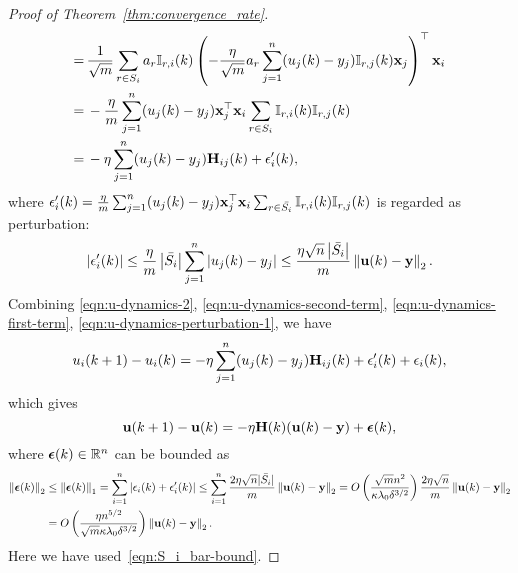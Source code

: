 \begin{proof}[Proof of Theorem~\ref{thm:convergence_rate}]
\begin{equation}
\begin{aligned}
	=\,& \frac{1}{\sqrt m} \sum_{r\in S_i} a_r \mathbb{I}_{r, i}(k) \left( - \frac{\eta}{\sqrt m} a_r \sum_{j=1}^n (u_j(k) - y_j) \mathbb{I}_{r, j}(k) \mathbf{x}_j  \right)^\top \mathbf{x}_i   \\
	=\,& -\frac{\eta}{m} \sum_{j=1}^n (u_j(k) - y_j) \mathbf{x}_j^\top\mathbf{x}_i \sum_{r\in S_i}  \mathbb{I}_{r, i}(k) \mathbb{I}_{r, j}(k) \\
	=\,& -\eta  \sum_{j=1}^n (u_j(k) - y_j) \mathbf{H}_{ij}(k) + \epsilon_i'(k),
	\end{aligned}
	\end{equation}
	where $\epsilon_i'(k) = \frac{\eta}{m} \sum_{j=1}^n (u_j(k) - y_j) \mathbf{x}_j^\top\mathbf{x}_i \sum_{r\in \bar{S_i}}  \mathbb{I}_{r, i}(k) \mathbb{I}_{r, j}(k)$ is regarded as perturbation:
	\begin{equation}  \label{eqn:u-dynamics-perturbation-1}
	\begin{aligned}
	\left|\epsilon_i'(k)\right| \le \frac{\eta}{m} \left|\bar{S_i}\right| \sum_{j=1}^n \left|u_j(k) - y_j\right| 
	\le \frac{\eta \sqrt n \left|\bar{S_i}\right| }{m} \left\|\mathbf{u}(k) - \mathbf{y}\right\|_2  .
	\end{aligned}
	\end{equation}
	Combining \eqref{eqn:u-dynamics-2}, \eqref{eqn:u-dynamics-second-term}, \eqref{eqn:u-dynamics-first-term}, \eqref{eqn:u-dynamics-perturbation-1}, we have
	\begin{equation*}
	\begin{aligned}
	u_i(k+1) - u_i(k) =  -\eta  \sum_{j=1}^n (u_j(k) - y_j) \mathbf{H}_{ij}(k) + \epsilon_i'(k) + \epsilon_i(k),
	\end{aligned}
	\end{equation*}	
	which gives
	\begin{equation} \label{eqn:u-dynamics-3}
	\mathbf{u}(k+1) - \mathbf{u}(k) = - \eta \mathbf{H}(k) (\mathbf{u}(k) - \mathbf{y}) + \bm{\epsilon}(k),
	\end{equation}
	where $\bm{\epsilon}(k) \in \mathbb{R}^n$ can be bounded as
	\begin{equation*}
	\begin{aligned}
	\left\|\bm{\epsilon}(k)\right\|_2 
	&\le \left\|\bm{\epsilon}(k)\right\|_1 = \sum_{i=1}^n \left| \epsilon_i(k) + \epsilon_i'(k) \right|
	\le \sum_{i=1}^n \frac{2 \eta \sqrt n |\bar{S_i}|}{m} \left\|\mathbf{u}(k) - \mathbf{y}\right\|_2
	= O\left( \frac{\sqrt{m} n^2 }{\kappa \lambda_0 \delta^{3/2}} \right)   \frac{2 \eta \sqrt n }{m} \left\|\mathbf{u}(k) - \mathbf{y}\right\|_2 \\
	&= O\left( \frac{\eta  n^{5/2} }{\sqrt m \kappa \lambda_0 \delta^{3/2}} \right)  \left\|\mathbf{u}(k) - \mathbf{y}\right\|_2.
	\end{aligned}
	\end{equation*}
	Here we have used~\eqref{eqn:S_i_bar-bound}.
	

\end{proof}
